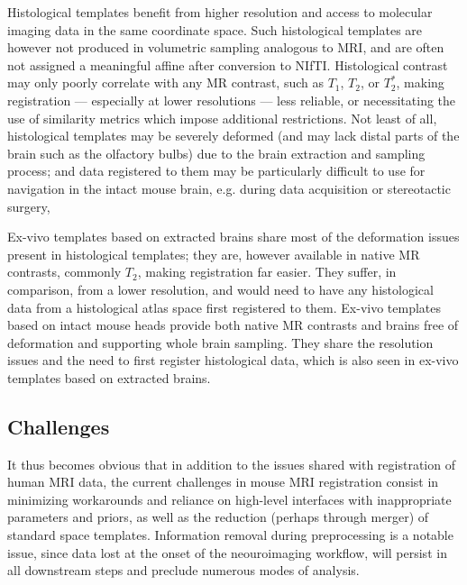 Histological templates benefit from higher resolution and access to molecular imaging data in the same coordinate space.
Such histological templates are however not produced in volumetric sampling analogous to MRI, and are often not assigned a meaningful affine after conversion to NIfTI.
Histological contrast may only poorly correlate with any MR contrast, such as $T_1$, $T_2$, or $T_2^*$, making registration --- especially at lower resolutions --- less reliable, or necessitating the use of similarity metrics which impose additional restrictions.
Not least of all, histological templates may be severely deformed (and may lack distal parts of the brain such as the olfactory bulbs) due to the brain extraction and sampling process;
and data registered to them may be particularly difficult to use for navigation in the intact mouse brain, e.g. during data acquisition or stereotactic surgery,

Ex-vivo templates based on extracted brains share most of the deformation issues present in histological templates;
they are, however available in native MR contrasts, commonly $T_2$, making registration far easier.
They suffer, in comparison, from a lower resolution, and would need to have any histological data from a histological atlas space first registered to them.
Ex-vivo templates based on intact mouse heads provide both native MR contrasts and brains free of deformation and supporting whole brain sampling.
They share the resolution issues and the need to first register histological data, which is also seen in ex-vivo templates based on extracted brains.

\subsection{Challenges}
It thus becomes obvious that in addition to the issues shared with registration of human MRI data, the current challenges in mouse MRI registration consist in minimizing workarounds and reliance on high-level interfaces with inappropriate parameters and priors, as well as the reduction (perhaps through merger) of standard space templates.
Information removal during preprocessing is a notable issue, since data lost at the onset of the neouroimaging workflow, will persist in all downstream steps and preclude numerous modes of analysis.


